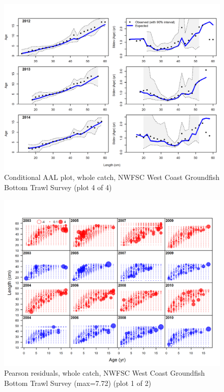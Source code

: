 \documentclass[12pt,]{article}
\begin{document}
\begin{figure}
\centering
\includegraphics{r4ss/plots_mod1/comp_condAALfit_Andre_plotsflt7mkt0_page4.png}
\caption{Conditional AAL plot, whole catch, NWFSC West Coast Groundfish
Bottom Trawl Survey (plot 4 of 4) \label{fig:nwfsc_combo_andre_4}}
\end{figure}

\begin{figure}
\centering
\includegraphics{r4ss/plots_mod1/comp_condAALfit_residsflt7mkt0_page1.png}
\caption{Pearson residuals, whole catch, NWFSC West Coast Groundfish
Bottom Trawl Survey (max=7.72) (plot 1 of 2)
\label{fig:nwfsc_combo_pearson_1}}
\end{figure}
\end{document}
